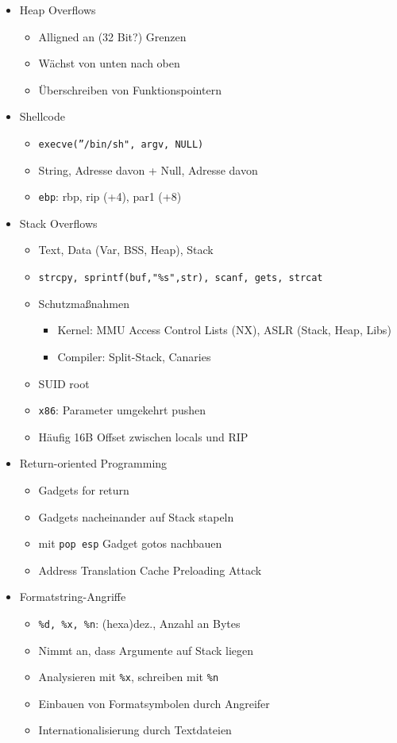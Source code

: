\documentclass[11pt, paper=a4, twocolumn]{scrartcl}
\begin{document}
\begin{itemize}
		\item Heap Overflows
			\begin{itemize}
				\item Alligned an (32 Bit?) Grenzen
				\item Wächst von unten nach oben
				\item Überschreiben von Funktionspointern
			\end{itemize}

		\item Shellcode
			\begin{itemize}
				\item \texttt{execve(''/bin/sh", argv, NULL)}
				\item String, Adresse davon + Null, Adresse davon
				\item \texttt{ebp}: rbp, rip (+4), par1 (+8)
			\end{itemize}

		\item Stack Overflows
			\begin{itemize}
				\item Text, Data (Var, BSS, Heap), Stack
				\item \texttt{strcpy, sprintf(buf,"\%s",str), scanf, 
					gets, strcat}
				\item Schutzmaßnahmen
					\begin{itemize}
						\item Kernel: MMU Access Control Lists 
							(NX), ASLR (Stack, Heap, Libs)
						\item Compiler: Split-Stack, Canaries
					\end{itemize}
				\item SUID root
				\item \texttt{x86}: Parameter umgekehrt pushen
				\item Häufig 16B Offset zwischen locals und RIP
			\end{itemize}

		\item Return-oriented Programming
			\begin{itemize}
				\item Gadgets for return
				\item Gadgets nacheinander auf Stack stapeln
				\item mit \texttt{pop esp} Gadget gotos nachbauen
				\item Address Translation Cache Preloading Attack
			\end{itemize}

		\item Formatstring-Angriffe
			\begin{itemize}
				\item \texttt{\%d, \%x, \%n}: (hexa)dez., Anzahl an Bytes
				\item Nimmt an, dass Argumente auf Stack liegen
				\item Analysieren mit \texttt{\%x}, schreiben mit 
					\texttt{\%n}
				\item Einbauen von Formatsymbolen durch Angreifer
				\item Internationalisierung durch Textdateien
			\end{itemize}


\end{itemize}
\end{document}
